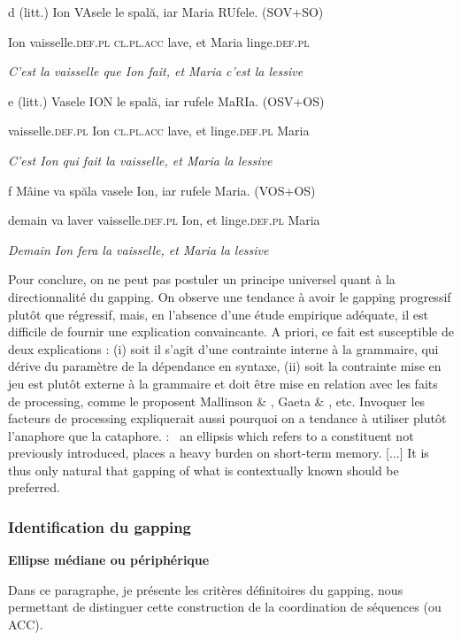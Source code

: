  d  (litt.) Ion VAsele le spală, iar Maria RUfele. (SOV+SO)

Ion vaisselle.\textsc{def.pl cl.pl.acc} lave, et Maria linge.\textsc{def.pl}

{\itshape
C'est la vaisselle que Ion fait, et Maria c'est la lessive}

 e  (litt.) Vasele    ION le     spală, iar rufele     MaRIa. (OSV+OS)

vaisselle.\textsc{def.pl} Ion  \textsc{cl.pl.acc} lave,  et  linge.\textsc{def.pl} Maria 

{\itshape
C'est Ion qui fait la vaisselle, et Maria la lessive}

 f  Mâine  va spăla vasele     Ion, iar rufele     Maria. (VOS+OS)

demain va laver vaisselle.\textsc{def.pl} Ion, et  linge.\textsc{def.pl} Maria

{\itshape
Demain Ion fera la vaisselle, et Maria la lessive}

Pour conclure, on ne peut pas postuler un principe universel quant à la directionnalité du gapping. On observe une tendance à avoir le gapping progressif plutôt que régressif, mais, en l'absence d'une étude empirique adéquate, il est difficile de fournir une explication convaincante. A priori, ce fait est susceptible de deux explications : (i) soit il s'agit d'une contrainte interne à la grammaire, qui dérive du paramètre de la dépendance en syntaxe, (ii) soit la contrainte mise en jeu est plutôt externe à la grammaire et doit être mise en relation avec les faits de processing, comme le proposent Mallinson \& \citet{Blake1981}, Gaeta \& \citet{Luraghi2001}, etc. Invoquer les facteurs de processing expliquerait aussi pourquoi on a tendance à utiliser plutôt l'anaphore que la cataphore. \citet[90]{Ramat1987} : {\guillemotleft}~an ellipsis which refers to a constituent not previously introduced, places a heavy burden on short-term memory. [...] It is thus only natural that gapping of what is contextually known should be preferred.~{\guillemotright}  

\subsubsection{Identification du gapping}
\label{bkm:Ref289905212}{\bfseries
Ellipse médiane ou périphérique}

Dans ce paragraphe, je présente les critères définitoires du gapping, nous permettant de distinguer cette construction de la coordination de séquences (ou ACC). 

